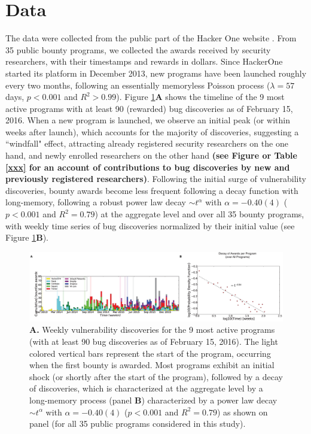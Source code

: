 \section{Data}
\label{sec:data}
The data were collected from the public part of the Hacker One website \cite{hackerOne}. From 35 public bounty programs, we collected the awards received by security researchers, with their timestamps and rewards in dollars. Since HackerOne started its platform in December 2013, new programs have been launched roughly every two months, following an essentially memoryless Poisson process ($\lambda = 57$ days, $p < 0.001$ and $R^2 > 0.99$). Figure \ref{timeline}{\bf A} shows the timeline of the 9 most active programs with at least 90 (rewarded) bug discoveries as of February 15, 2016. When a new program is launched, we observe an initial peak (or within weeks after launch), which accounts for the majority of discoveries, suggesting a ``windfall" effect, attracting already registered security researchers on the one hand, and newly enrolled researchers on the other hand {\bf (see Figure or Table \ref{xxx} for an account of contributions to bug discoveries by new and previously registered researchers)}. Following the initial surge of vulnerability discoveries, bounty awards become less frequent following a decay function with long-memory, following a robust power law decay $\sim t^{\alpha}$ with $\alpha = -0.40(4)$ ($p < 0.001$ and $R^2 = 0.79$) at the aggregate level and over all 35 bounty programs, with weekly time series of bug discoveries normalized by their initial value (see Figure \ref{timeline}{\bf B}).\\


\begin{figure}[h]
\begin{center}
\includegraphics[width=17cm]{figures/timeline.eps}
\caption{{\bf A.} Weekly vulnerability discoveries for the 9 most active programs (with at least 90 bug discoveries as of February 15, 2016). The light colored vertical bars represent the start of the program, occurring when the first bounty is awarded. Most programs exhibit an initial shock (or shortly after the start of the program), followed by a decay of discoveries, which is characterized at the aggregate level by a long-memory process (panel {\bf B}) characterized by a power law decay $\sim t^{\alpha}$ with $\alpha = -0.40(4)$ ($p < 0.001$ and $R^2 = 0.79$) as shown on panel  (for all 35 public programs considered in this study).}
\label{timeline}
\end{center}
\end{figure}



